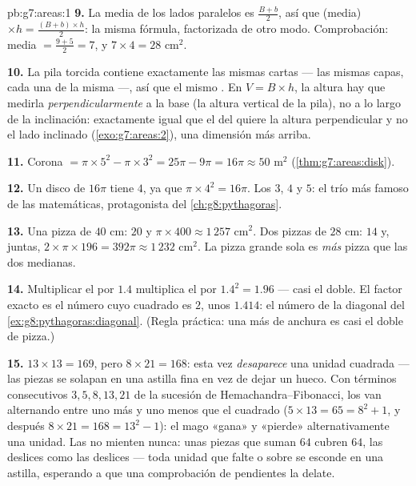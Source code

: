 \begin{solution}{pb:g7:areas:1}
\textbf{9.} La media de los lados paralelos es
$\frac{B + b}{2}$, así que (media) $\times h =
\frac{(B+b) \times h}{2}$: la misma fórmula, factorizada
de otro modo. Comprobación: media $= \frac{9+5}{2} = 7$, y
$7 \times 4 = 28$ cm$^2$.

\textbf{10.} La pila torcida contiene exactamente las mismas cartas
--- las mismas capas, cada una de la misma  ---, así que el mismo
. En $V = B \times h$, la altura hay que medirla
\emph{perpendicularmente} a la base (la altura vertical de la
pila), no a lo largo de la inclinación: exactamente igual que el  del
 quiere la altura perpendicular y no el lado inclinado
(\cref{exo:g7:areas:2}), una dimensión más arriba.

\textbf{11.} Corona $= \pi \times 5^2 - \pi \times 3^2 = 25\pi -
9\pi = 16\pi \approx 50$ m$^2$ (\cref{thm:g7:areas:disk}).

\textbf{12.} Un disco de  $16\pi$ tiene  $4$, ya que
$\pi \times 4^2 = 16\pi$. Los  $3$, $4$ y $5$: el trío más
famoso de las matemáticas, protagonista del
\cref{ch:g8:pythagoras}.

\textbf{13.} Una pizza de $40$ cm:  $20$ y
 $\pi \times 400 \approx 1\,257$ cm$^2$. Dos pizzas de $28$ cm:
 $14$ y, juntas,
$2 \times \pi \times 196 = 392\pi \approx 1\,232$ cm$^2$. La
pizza grande sola es \emph{más} pizza que las dos medianas.

\textbf{14.} Multiplicar el  por $1.4$ multiplica el  por
$1.4^2 = 1.96$ --- casi el doble. El factor exacto es el
número cuyo cuadrado es $2$, unos $1.414$: el número de la diagonal
del \cref{ex:g8:pythagoras:diagonal}. (Regla práctica: una  más
de anchura es casi el doble de pizza.)

\textbf{15.} $13 \times 13 = 169$, pero $8 \times 21 = 168$:
esta vez \emph{desaparece} una unidad cuadrada --- las piezas
se solapan en una astilla fina en vez de dejar un hueco. Con
términos consecutivos $3, 5, 8, 13, 21$ de la sucesión de
Hemachandra--Fibonacci, los  van alternando entre uno
más y uno menos que el cuadrado ($5 \times 13 = 65 =
8^2 + 1$, y después $8 \times 21 = 168 = 13^2 - 1$): el mago
«gana» y «pierde» alternativamente una unidad. Las  no mienten nunca:
unas piezas que suman $64$ cubren $64$, las deslices como las deslices --- toda
unidad que falte o sobre se esconde en una astilla, esperando a que una
comprobación de pendientes la delate.
\end{solution}
